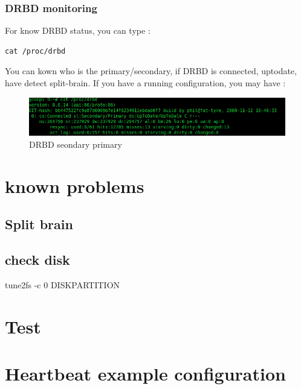 \documentclass[a4paper,10pt]{report}
\begin{document}
\subsection{DRBD monitoring}
For know DRBD status, you can type :
\begin{lstlisting}
cat /proc/drbd
\end{lstlisting}
You can kown who is the primary/secondary, if DRBD is connected, uptodate, have detect split-brain. If you have a running configuration, you may have :
\begin{figure}[!h]
\includegraphics[scale=0.5]{schema/drbd-s-p.png}
\caption{DRBD seondary primary} 
\label{hb-gui-2nodes} 
\end{figure}

\chapter{known problems}
\section{Split brain}
\section{check disk}
tune2fs -c 0 DISKPARTITION
\label{splitbrain} 

\chapter{Test}
















\appendix
\chapter{Heartbeat example configuration}
\label{cibexample}
\end{document}
